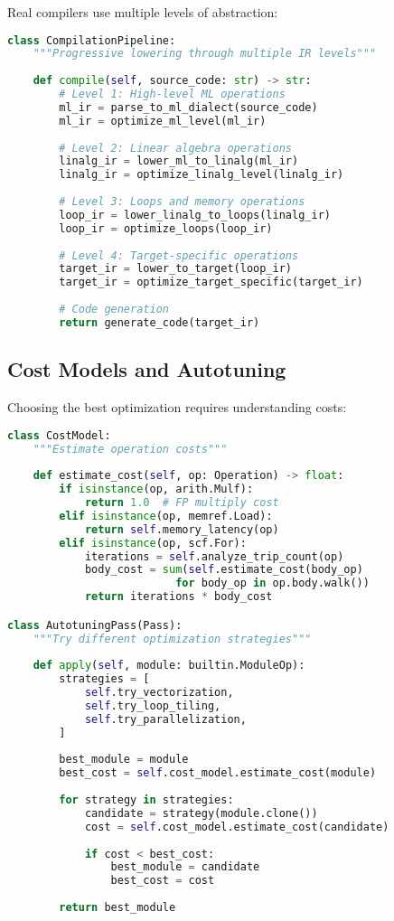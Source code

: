\documentclass[11pt,a4paper]{article}
\begin{document}
Real compilers use multiple levels of abstraction:

\begin{lstlisting}[language=Python, caption=Multi-Level Compilation Pipeline]
class CompilationPipeline:
    """Progressive lowering through multiple IR levels"""
    
    def compile(self, source_code: str) -> str:
        # Level 1: High-level ML operations
        ml_ir = parse_to_ml_dialect(source_code)
        ml_ir = optimize_ml_level(ml_ir)
        
        # Level 2: Linear algebra operations
        linalg_ir = lower_ml_to_linalg(ml_ir)
        linalg_ir = optimize_linalg_level(linalg_ir)
        
        # Level 3: Loops and memory operations
        loop_ir = lower_linalg_to_loops(linalg_ir)
        loop_ir = optimize_loops(loop_ir)
        
        # Level 4: Target-specific operations
        target_ir = lower_to_target(loop_ir)
        target_ir = optimize_target_specific(target_ir)
        
        # Code generation
        return generate_code(target_ir)
\end{lstlisting}

\subsection{Cost Models and Autotuning}

Choosing the best optimization requires understanding costs:

\begin{lstlisting}[language=Python, caption=Cost-Based Optimization]
class CostModel:
    """Estimate operation costs"""
    
    def estimate_cost(self, op: Operation) -> float:
        if isinstance(op, arith.Mulf):
            return 1.0  # FP multiply cost
        elif isinstance(op, memref.Load):
            return self.memory_latency(op)
        elif isinstance(op, scf.For):
            iterations = self.analyze_trip_count(op)
            body_cost = sum(self.estimate_cost(body_op) 
                          for body_op in op.body.walk())
            return iterations * body_cost

class AutotuningPass(Pass):
    """Try different optimization strategies"""
    
    def apply(self, module: builtin.ModuleOp):
        strategies = [
            self.try_vectorization,
            self.try_loop_tiling,
            self.try_parallelization,
        ]
        
        best_module = module
        best_cost = self.cost_model.estimate_cost(module)
        
        for strategy in strategies:
            candidate = strategy(module.clone())
            cost = self.cost_model.estimate_cost(candidate)
            
            if cost < best_cost:
                best_module = candidate
                best_cost = cost
        
        return best_module
\end{lstlisting}
\end{document}
